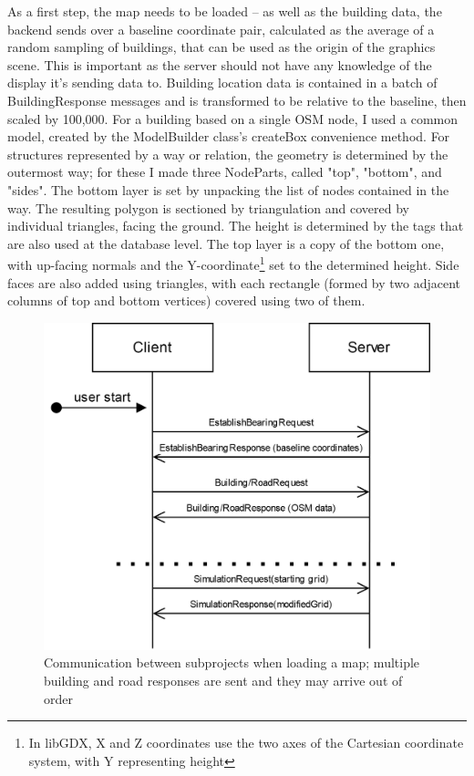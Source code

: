 As a first step, the map needs to be loaded -- as well as the building data, the backend sends over a baseline coordinate pair, calculated as the average of a random sampling of buildings, that can be used as the origin of the graphics scene. This is important as the server should not have any knowledge of the display it's sending data to. Building location data is contained in a batch of BuildingResponse messages and is transformed to be relative to the baseline, then scaled by 100,000. For a building based on a single OSM node, I used a common model, created by the ModelBuilder class's createBox convenience method. For structures represented by a way or relation, the geometry is determined by the outermost way; for these I made three NodeParts, called "top", "bottom", and "sides". The bottom layer is set by unpacking the list of nodes contained in the way. The resulting polygon is sectioned by triangulation and covered by individual triangles, facing the ground. The height is determined by the tags that are also used at the database level. The top layer is a copy of the bottom one, with up-facing normals and the Y-coordinate\footnote{In libGDX, X and Z coordinates use the two axes of the Cartesian coordinate system, with Y representing height} set to the determined height. Side faces are also added using triangles, with each rectangle (formed by two adjacent columns of top and bottom vertices) covered using two of them.

\begin{figure}[!h]
    \centering
    \includegraphics[width=120mm, keepaspectratio]{images/communication.png}
    \caption{Communication between subprojects when loading a map; multiple building and road responses are sent and they may arrive out of order }
\end{figure}

